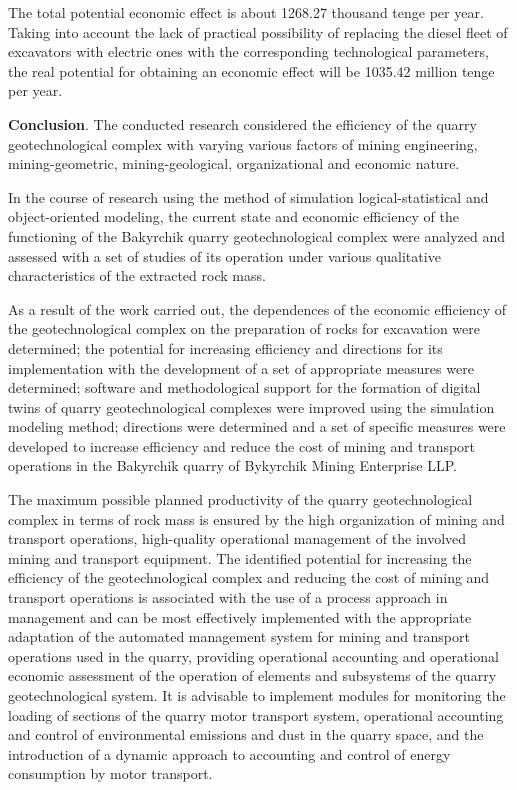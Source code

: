 \begin{multicols}{2}
The total potential economic effect is about 1268.27 thousand tenge per
year. Taking into account the lack of practical possibility of replacing
the diesel fleet of excavators with electric ones with the corresponding
technological parameters, the real potential for obtaining an economic
effect will be 1035.42 million tenge per year.

{\bfseries Conclusion}. The conducted research considered the efficiency of
the quarry geotechnological complex with varying various factors of
mining engineering, mining-geometric, mining-geological, organizational
and economic nature.

In the course of research using the method of simulation
logical-statistical and object-oriented modeling, the current state and
economic efficiency of the functioning of the Bakyrchik quarry
geotechnological complex were analyzed and assessed with a set of
studies of its operation under various qualitative characteristics of
the extracted rock mass.

As a result of the work carried out, the dependences of the economic
efficiency of the geotechnological complex on the preparation of rocks
for excavation were determined; the potential for increasing efficiency
and directions for its implementation with the development of a set of
appropriate measures were determined; software and methodological
support for the formation of digital twins of quarry geotechnological
complexes were improved using the simulation modeling method; directions
were determined and a set of specific measures were developed to
increase efficiency and reduce the cost of mining and transport
operations in the Bakyrchik quarry of Bykyrchik Mining Enterprise LLP.

The maximum possible planned productivity of the quarry geotechnological
complex in terms of rock mass is ensured by the high organization of
mining and transport operations, high-quality operational management of
the involved mining and transport equipment. The identified potential
for increasing the efficiency of the geotechnological complex and
reducing the cost of mining and transport operations is associated with
the use of a process approach in management and can be most effectively
implemented with the appropriate adaptation of the automated management
system for mining and transport operations used in the quarry, providing
operational accounting and operational economic assessment of the
operation of elements and subsystems of the quarry geotechnological
system. It is advisable to implement modules for monitoring the loading
of sections of the quarry motor transport system, operational accounting
and control of environmental emissions and dust in the quarry space, and
the introduction of a dynamic approach to accounting and control of
energy consumption by motor transport.


\end{multicols}
